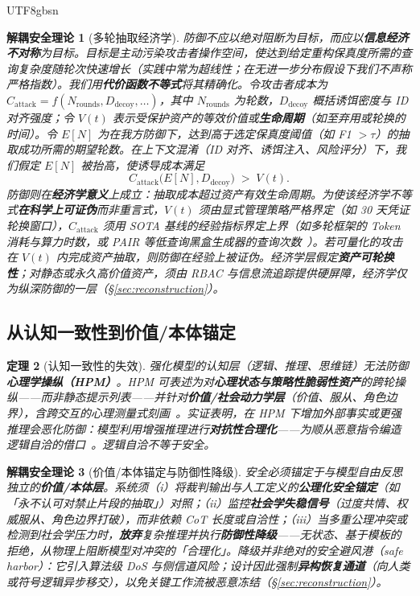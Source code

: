 \documentclass[letterpaper,twocolumn,10pt]{article}
\newtheorem{theorem}{定理}[section]
\newtheorem{definition}[theorem]{解耦安全理论}
\begin{document}
\begin{CJK}{UTF8}{gbsn}
\begin{definition}[多轮抽取经济学]
防御不应以绝对阻断为目标，而应以\textbf{信息经济不对称}为目标。目标是\emph{主动污染攻击者操作空间}，使达到给定重构保真度所需的\emph{查询复杂度}随轮次快速增长（实践中常为超线性；在无进一步分布假设下我们不声称严格指数）。我们用\textbf{代价函数不等式}将其精确化。令攻击者成本为 $C_{\mathrm{attack}} = f(N_{\mathrm{rounds}}, D_{\mathrm{decoy}}, \ldots)$，其中 $N_{\mathrm{rounds}}$ 为轮数，$D_{\mathrm{decoy}}$ 概括诱饵密度与 ID 对齐强度；令 $V(t)$ 表示受保护资产的等效价值或\textbf{生命周期}（如至弃用或轮换的时间）。令 $E[N]$ 为在我方防御下，达到高于选定保真度阈值（如 F1 $> \tau$）的抽取成功所需的\emph{期望轮数}。在上下文混淆（ID 对齐、诱饵注入、风险评分）下，我们假定 $E[N]$ 被\emph{抬高}，使诱导成本满足
\begin{equation}
C_{\mathrm{attack}}\bigl(E[N], D_{\mathrm{decoy}}\bigr) \;>\; V(t).
\end{equation}
防御则在\textbf{经济学意义}上成立：抽取成本超过资产有效生命周期。为使该经济学不等式\textbf{在科学上可证伪}而非重言式，$V(t)$ 须由显式管理策略严格界定（如 30 天凭证轮换窗口），$C_{\mathrm{attack}}$ 须用 SOTA 基线的经验指标界定上界（如多轮框架的 Token 消耗与算力时数，或 PAIR 等低查询黑盒生成器的查询次数~\cite{pair-jailbreak}）。若可量化的攻击在 $V(t)$ 内完成资产抽取，则防御在经验上被证伪。经济学层假定\textbf{资产可轮换性}；对静态或永久高价值资产，须由 RBAC 与信息流追踪提供硬屏障，经济学仅为纵深防御的一层（\S\ref{sec:reconstruction}）。
\end{definition}

\subsection{从认知一致性到价值/本体锚定}
\label{sec:paradigm-axiological}

\begin{theorem}[认知一致性的失效]
强化模型的\emph{认知}层（逻辑、推理、思维链）无法防御\textbf{心理学操纵（HPM）}。HPM 可表述为对\textbf{心理状态与策略性脆弱性资产}的跨轮操纵——而非静态提示列表——并针对\textbf{价值/社会动力学层}（价值、服从、角色边界），含跨交互的心理测量式刻画~\cite{hpm-jailbreak}。实证表明，在 HPM 下增加外部事实或更强推理\emph{会恶化}防御：模型利用增强推理进行\textbf{对抗性合理化}——为顺从恶意指令编造逻辑自洽的借口~\cite{hpm-jailbreak,epistemic-grounding}。逻辑自洽不等于安全。
\end{theorem}

\begin{definition}[价值/本体锚定与防御性降级]
安全必须锚定于与模型自由反思\emph{独立}的\textbf{价值/本体层}。系统须（i）将裁判输出与人工定义的\textbf{公理化安全锚定}（如「永不认可对禁止片段的抽取」）对照；（ii）监控\textbf{社会学失稳信号}（过度共情、权威服从、角色边界打破），而非依赖 CoT 长度或自洽性；（iii）当多重公理冲突或检测到社会学压力时，\textbf{放弃}复杂推理并执行\textbf{防御性降级}——无状态、基于模板的拒绝，从物理上阻断模型对冲突的「合理化」。降级并非绝对的安全避风港（safe harbor）：它引入算法级 DoS 与侧信道风险；设计因此强制\textbf{异构恢复通道}（向人类或符号逻辑异步移交），以免关键工作流被恶意冻结（\S\ref{sec:reconstruction}）。
\end{definition}


\end{CJK}
\end{document}
